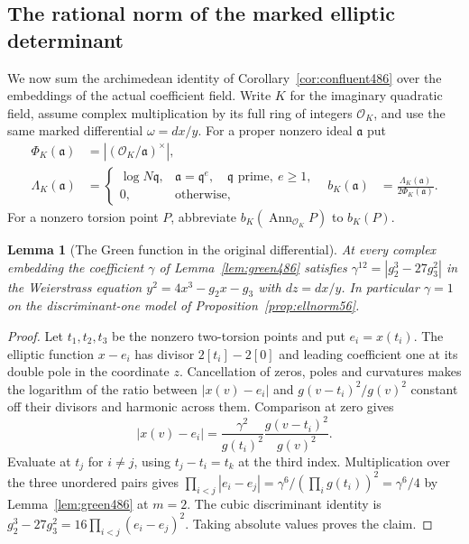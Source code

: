 \documentclass[a4paper,11pt]{article}
\newtheorem{lemma}[proposition]{Lemma}
\theoremstyle{definition}
\theoremstyle{remark}
\numberwithin{equation}{section}
\begin{document}
\subsection{The rational norm of the marked elliptic determinant}
\label{sec:jetnorm487}

We now sum the archimedean identity of
Corollary~\ref{cor:confluent486} over the embeddings of the
actual coefficient field. Write \(K\) for the imaginary quadratic
field, assume complex multiplication by its full ring of integers
\(\mathcal O_K\), and use the same marked differential
\(\omega=dx/y\). For a proper nonzero ideal \(\mathfrak a\) put
\[
 \begin{aligned}
  \Phi_K(\mathfrak a)&=|(\mathcal O_K/\mathfrak a)^\times|,\\
  \Lambda_K(\mathfrak a)&=
     \begin{cases}\log N\mathfrak q,&
               \mathfrak a=\mathfrak q^e,\quad \mathfrak q
                    \text{ prime},\ e\ge1,\\
               0,&\text{otherwise},\end{cases}
  & b_K(\mathfrak a)&=\frac{\Lambda_K(\mathfrak a)}
                                    {2\Phi_K(\mathfrak a)} .
 \end{aligned}
\]
For a nonzero torsion point \(P\), abbreviate
\(b_K(\operatorname{Ann}_{\mathcal O_K} P)\) to \(b_K(P)\).

\begin{lemma}[The Green function in the original differential]\leavevmode
\label{lem:cmslope487}
At every complex embedding the coefficient \(\gamma\) of
Lemma~\ref{lem:green486} satisfies
\(\gamma^{12}=|g_2^3-27g_3^2|\) in the Weierstrass equation
\(y^2=4x^3-g_2x-g_3\) with \(dz=dx/y\). In particular
\(\gamma=1\) on the discriminant-one model of
Proposition~\ref{prop:ellnorm56}.
\end{lemma}
\begin{proof}
Let \(t_1,t_2,t_3\) be the nonzero two-torsion points and put
\(e_i=x(t_i)\). The elliptic function \(x-e_i\) has divisor
\(2[t_i]-2[0]\) and leading coefficient one at its double
pole in the coordinate \(z\). Cancellation of zeros, poles and
curvatures makes the logarithm of the ratio between
\(|x(v)-e_i|\) and \(g(v-t_i)^2/g(v)^2\) constant off their
divisors and harmonic across them. Comparison at zero gives
\[
   |x(v)-e_i|=\frac{\gamma^2}{g(t_i)^2}
                               \frac{g(v-t_i)^2}{g(v)^2}.
\]
Evaluate at \(t_j\) for \(i\ne j\), using
\(t_j-t_i=t_k\) at the third index. Multiplication over the
three unordered pairs gives
\(\prod_{i<j}|e_i-e_j|=\gamma^6/(\prod_i g(t_i))^2=\gamma^6/4\)
by Lemma~\ref{lem:green486} at \(m=2\). The cubic discriminant
identity is \(g_2^3-27g_3^2=16\prod_{i<j}(e_i-e_j)^2\).
Taking absolute values proves the claim.
\end{proof}
\end{document}
